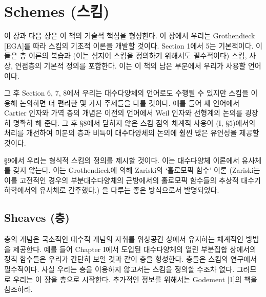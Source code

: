 	
	
	\chapter{Schemes (스킴)}
	이 장과 다음 장은 이 책의 기술적 핵심을 형성한다.
	이 장에서 우리는 Grothendieck [EGA]를 따라 스킴의 기초적 이론을 개발할 것이다.
	Section 1에서 5는 기본적이다. 이들은 층 이론의 복습과 (이는 심지어 스킴을 정의하기 위해서도 필수적이다)
	스킴, 사상, 연접층의 기본적 정의를 포함한다. 이는 이 책의 남은 부분에서 우리가 사용할 언어이다.
	
	그 후 Section 6, 7, 8에서 우리는 대수다양체의 언어로도 수행될 수 있지만
	스킴을 이용해 논의하면 더 편리한 몇 가지 주제들을 다룰 것이다.
	예를 들어 새 언어에서 Cartier 인자와 가역 층의 개념은 이전의 언어에서 Weil 인자와 선형계의 논의를 굉장히 명확히 해 준다.
	그 후 \S 8에서 닫히지 않은 스킴 점의 체계적 사용이 (I, \S 5)에서의 처리를 개선하여
	미분의 층과 비특이 대수다양체의 논의에 훨씬 많은 유연성을 제공할 것이다.
	
	\S 9에서 우리는 형식적 스킴의 정의를 제시할 것이다. 이는 대수다양체 이론에서 유사체를 갖지 않는다.
	이는 Grothendieck에 의해 Zariski의 `홀로모픽 함수' 이론%
	(Zariski는 이를 고전적인 경우의 부분대수다양체의 근방에서의 홀로모픽 함수들의 추상적 대수기하학에서의 유사체로 간주했다.)%
	을 다루는 좋은 방식으로서 발명되었다.
	
	
	\section{Sheaves (층)}
	층의 개념은 국소적인 대수적 개념의 자취를 위상공간 상에서 유지하는 체계적인 방법을 제공한다.
	예를 들어 Chapter I에서 도입된 대수다양체의 열린 부분집합 상에서의 정칙 함수들은 우리가 간단히 보일 것과 같이 층을 형성한다.
	층들은 스킴의 연구에서 필수적이다. 사실 우리는 층을 이용하지 않고서는 스킴을 정의할 수조차 없다.
	그러므로 우리는 이 장을 층으로 시작한다. 추가적인 정보를 위해서는 Godement [1]의 책을 참조하라.
	
